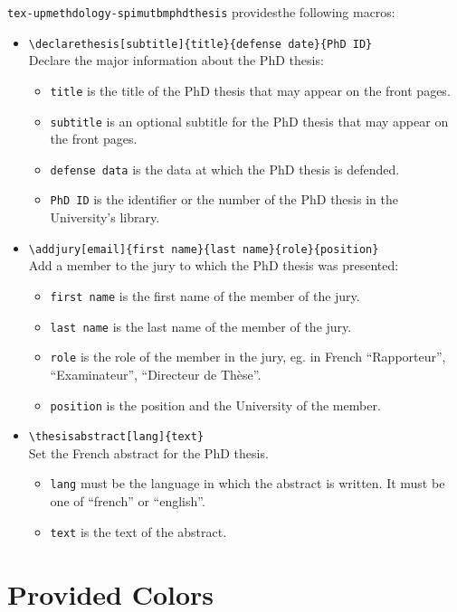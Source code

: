 \documentclass[article,english]{upmethodology-document}
\begin{document}
\texttt{tex-upmethdology-spimutbmphdthesis} providesthe following macros:
\begin{itemize}
\item \texttt{{\textbackslash}declarethesis[subtitle]\{title\}\{defense date\}\{PhD ID\}} \\
	Declare the major information about the PhD thesis:
	\begin{itemize}
	\item \texttt{title} is the title of the PhD thesis that may appear on the front pages.
	\item \texttt{subtitle} is an optional subtitle for the PhD thesis that may appear on the front pages.
	\item \texttt{defense data} is the data at which the PhD thesis is defended.
	\item \texttt{PhD ID} is the identifier or the number of the PhD thesis in the University's library.
	\end{itemize}
\item \texttt{{\textbackslash}addjury[email]\{first name\}\{last name\}\{role\}\{position\}} \\
	Add a member to the jury to which the PhD thesis was presented:
	\begin{itemize}
	\item \texttt{first name} is the first name of the member of the jury.
	\item \texttt{last name} is the last name of the member of the jury.
	\item \texttt{role} is the role of the member in the jury, eg. in French ``Rapporteur'', ``Examinateur'', ``Directeur de Th\`ese''.
	\item \texttt{position} is the position and the University of the member.
	\end{itemize}
\item \texttt{{\textbackslash}thesisabstract[lang]\{text\}} \\
	Set the French abstract for the PhD thesis.
	\begin{itemize}
	\item \texttt{lang} must be the language in which the abstract is written. It must be one of ``french'' or ``english''.
	\item \texttt{text} is the text of the abstract.
	\end{itemize}
\end{itemize}

\section{Provided Colors}
\end{document}
